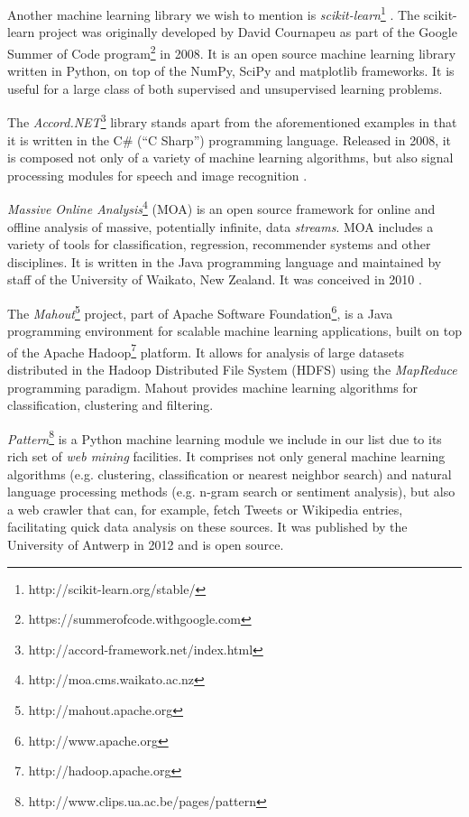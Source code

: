 Another machine learning library we wish to mention is
\emph{scikit-learn}\footnote{http://scikit-learn.org/stable/} \cite{scikit}. The
scikit-learn project was originally developed by David Cournapeu as part of the
Google Summer of Code program\footnote{https://summerofcode.withgoogle.com} in
2008. It is an open source machine learning library written in Python, on top of
the NumPy, SciPy and matplotlib frameworks. It is useful for a large class of
both supervised and unsupervised learning problems.

The \emph{Accord.NET}\footnote{http://accord-framework.net/index.html} library
stands apart from the aforementioned examples in that it is written in the C\#
(``C Sharp'') programming language. Released in 2008, it is composed not only of
a variety of machine learning algorithms, but also signal processing modules for
speech and image recognition \cite{accord}.

\emph{Massive Online Analysis}\footnote{http://moa.cms.waikato.ac.nz} (MOA) is
an open source framework for online and offline analysis of massive, potentially
infinite, data \emph{streams}. MOA includes a variety of tools for
classification, regression, recommender systems and other disciplines. It is
written in the Java programming language and maintained by staff of the
University of Waikato, New Zealand. It was conceived in 2010 \cite{moa}.

The \emph{Mahout}\footnote{http://mahout.apache.org} project, part of Apache
Software Foundation\footnote{http://www.apache.org}, is a Java programming
environment for scalable machine learning applications, built on top of the
Apache Hadoop\footnote{http://hadoop.apache.org} platform. It allows for
analysis of large datasets distributed in the Hadoop Distributed File System
(HDFS) using the \emph{MapReduce} programming paradigm. Mahout provides
machine learning algorithms for classification, clustering and filtering.

\emph{Pattern}\footnote{http://www.clips.ua.ac.be/pages/pattern} is a Python
machine learning module we include in our list due to its rich set of
\emph{web mining} facilities. It comprises not only general machine learning
algorithms (e.g. clustering, classification or nearest neighbor search) and
natural language processing methods (e.g. n-gram search or sentiment analysis),
but also a web crawler that can, for example, fetch Tweets or Wikipedia entries,
facilitating quick data analysis on these sources. It was published by the
University of Antwerp in 2012 and is open source.

